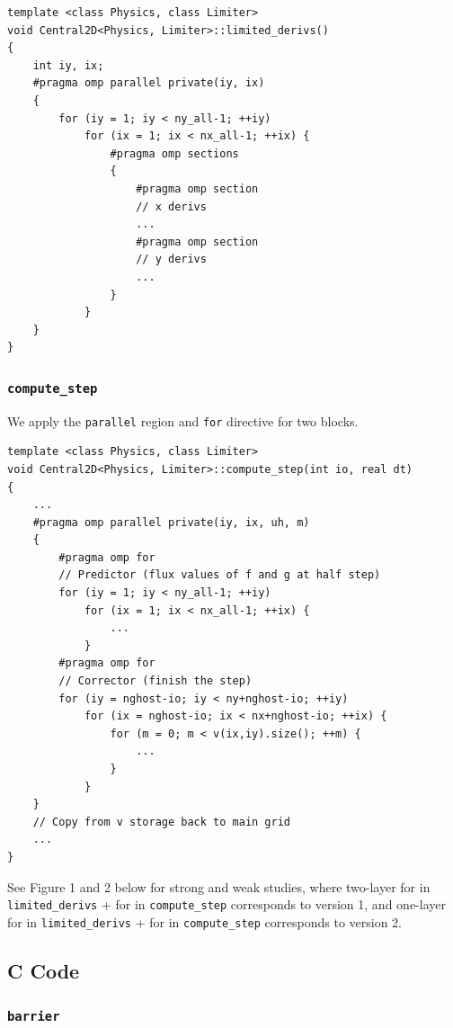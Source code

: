 \documentclass[12pt]{article}
\numberwithin{equation}{section}
\begin{document}
\scriptsize
\begin{lstlisting}
template <class Physics, class Limiter>
void Central2D<Physics, Limiter>::limited_derivs()
{
    int iy, ix;
    #pragma omp parallel private(iy, ix)
    {
        for (iy = 1; iy < ny_all-1; ++iy)
            for (ix = 1; ix < nx_all-1; ++ix) {
                #pragma omp sections
                {
                    #pragma omp section
                    // x derivs
                    ...
                    #pragma omp section
                    // y derivs
                    ...
                }
            }
    }
}
\end{lstlisting}

\subsubsection{\texttt{compute\_step}}

\normalsize
We apply the \texttt{parallel} region and \texttt{for} directive for two blocks.

\scriptsize
\begin{lstlisting}
template <class Physics, class Limiter>
void Central2D<Physics, Limiter>::compute_step(int io, real dt)
{
    ...
    #pragma omp parallel private(iy, ix, uh, m)
    {
        #pragma omp for
        // Predictor (flux values of f and g at half step)
        for (iy = 1; iy < ny_all-1; ++iy)
            for (ix = 1; ix < nx_all-1; ++ix) {
                ...
            }
        #pragma omp for
        // Corrector (finish the step)
        for (iy = nghost-io; iy < ny+nghost-io; ++iy)
            for (ix = nghost-io; ix < nx+nghost-io; ++ix) {
                for (m = 0; m < v(ix,iy).size(); ++m) {
                    ...
                }
            }
    }
    // Copy from v storage back to main grid
    ...
}
\end{lstlisting}
\normalsize
See Figure 1 and 2 below for strong and weak studies, where two-layer for in \texttt{limited\_derivs} + for in \texttt{compute\_step} corresponds to version 1, and one-layer for in \texttt{limited\_derivs} + for in \texttt{compute\_step} corresponds to version 2.

\subsection{C Code}

\subsubsection{\texttt{barrier}}
\end{document}
